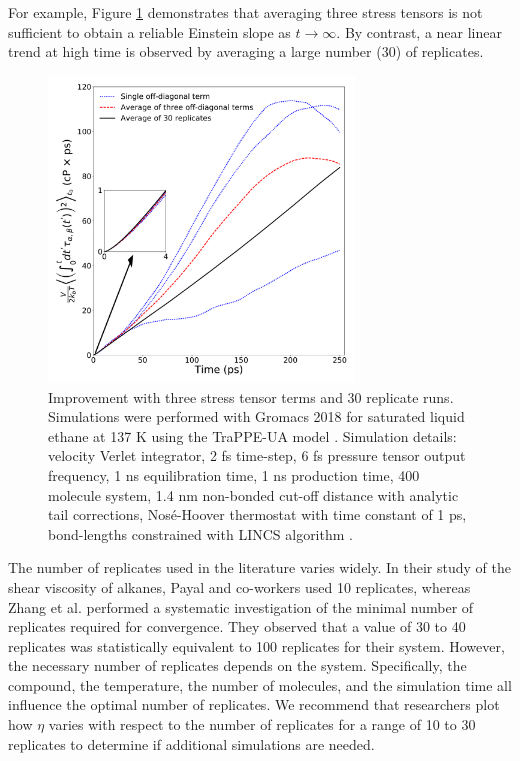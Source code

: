 \documentclass[9pt,bestpractices]{livecoms}
\begin{document}
For example, Figure \ref{fig:Einstein_3terms_30replicates} demonstrates that averaging three stress tensors is not sufficient to obtain a reliable Einstein slope as $t \to \infty$. By contrast, a near linear trend at high time is observed by averaging a large number (30) of replicates.

\begin{figure}[htb!]
	\centering
	\includegraphics[width=3.2in]{Einstein_3terms_30replicates.pdf}
	\caption{Improvement with three stress tensor terms and 30 replicate runs. Simulations were performed with Gromacs 2018 for saturated liquid ethane at 137 K using the TraPPE-UA model \cite{Martin1998}. Simulation details: velocity Verlet integrator, 2 fs time-step, 6 fs pressure tensor output frequency, 1 ns equilibration time, 1 ns production time, 400 molecule system, 1.4 nm non-bonded cut-off distance with analytic tail corrections, Nos{\'e}-Hoover thermostat with time constant of 1 ps, bond-lengths constrained with LINCS algorithm \cite{GROMACS}.}
	\label{fig:Einstein_3terms_30replicates}
\end{figure}

The number of replicates used in the literature varies widely. In their study of the shear viscosity of alkanes, Payal and co-workers \cite{Payal2012} used 10 replicates, whereas Zhang et al. \cite{Zhang2015} performed a systematic investigation of the minimal number of replicates required for convergence. They observed that a value of 30 to 40 replicates was statistically equivalent to 100 replicates for their system. However, the necessary number of replicates depends on the system. Specifically, the compound, the temperature, the number of molecules, and the simulation time all influence the optimal number of replicates. We recommend that researchers plot how $\eta$ varies with respect to the number of replicates for a range of 10 to 30 replicates to determine if additional simulations are needed.
\end{document}
